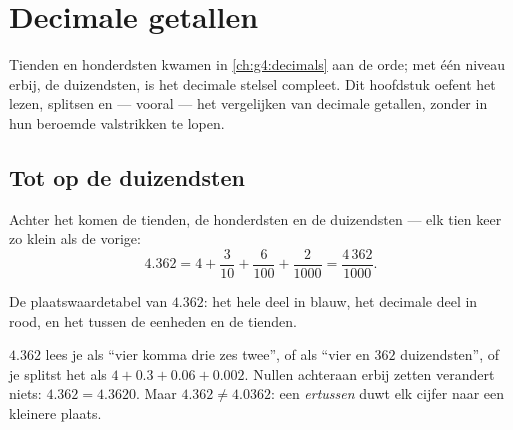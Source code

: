 \chapter{Decimale getallen}\label{ch:g5:decimals}

Tienden en honderdsten kwamen in \cref{ch:g4:decimals} aan de orde; met één
niveau erbij, de duizendsten, is het decimale stelsel compleet. Dit
hoofdstuk oefent het lezen, splitsen en --- vooral --- het vergelijken van
decimale getallen, zonder in hun beroemde valstrikken te lopen.

\section{Tot op de duizendsten}

\begin{definition}\label{def:g5:decimals:places}
Achter het  komen de tienden, de honderdsten en de
duizendsten --- elk tien keer zo klein als de vorige:
\[
4.362 = 4 + \frac{3}{10} + \frac{6}{100} + \frac{2}{1000}
= \frac{4\,362}{1000}.
\]
\end{definition}

\begin{omfigure}

{\small De plaatswaardetabel van $4.362$: het hele deel in blauw, het
decimale deel in rood, en het  tussen de eenheden en de
tienden.}
\end{omfigure}

\begin{example}\label{ex:g5:decimals:readings}
$4.362$ lees je als ``vier komma drie zes twee'', of als ``vier en $362$
duizendsten'', of je splitst het als $4 + 0.3 + 0.06 + 0.002$. Nullen
achteraan erbij zetten verandert niets: $4.362 = 4.3620$. Maar
$4.362 \neq 4.0362$: een  \emph{ertussen} duwt elk cijfer naar een
kleinere plaats.
\end{example}

